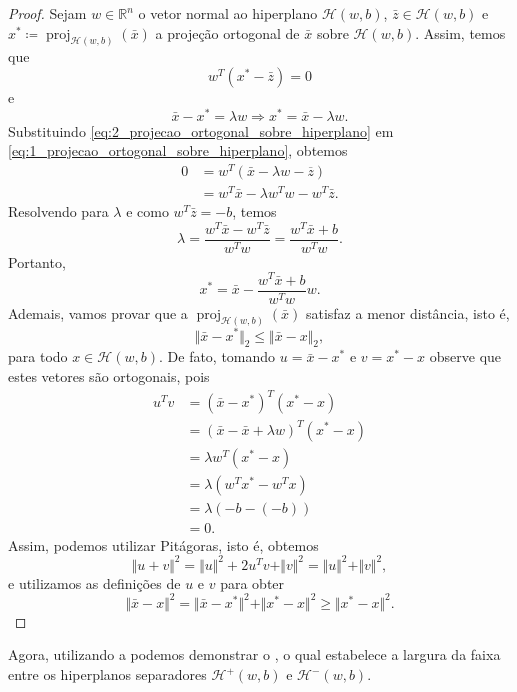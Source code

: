 \documentclass[12pt,a4paper]{scrartcl}
\DeclareMathOperator{\proj}{proj}
\def\Hset{\mathcal{H}}
\def\RR{\mathds{R}}
\def\xbar{\bar{x}}
\theoremstyle{definition}%
\begin{document}
\begin{proof}
Sejam $w\in \RR^n$ o vetor normal ao hiperplano $\Hset(w,b)$, $\bar{z}\in \Hset(w,b)$ e $x^{*} \coloneqq \proj_{\Hset (w,b)}(\xbar)$ a projeção ortogonal de $\xbar$ sobre $\Hset(w,b)$. Assim, temos que 
\[ \label{eq:1_projecao_ortogonal_sobre_hiperplano} 
w^{T}(x^{*}-\bar{z})=0 
\]
e
\[ \label{eq:2_projecao_ortogonal_sobre_hiperplano} 
\xbar-x^{*}=\lambda w \Longrightarrow x^{*}=\xbar-\lambda w. 
\]
Substituindo \eqref{eq:2_projecao_ortogonal_sobre_hiperplano} em \eqref{eq:1_projecao_ortogonal_sobre_hiperplano}, obtemos
\begin{align}
0 &= w^{T}(\xbar-\lambda w-\overline{z}) \\
&= w^{T}\xbar-\lambda w^{T}w - w^{T}\bar{z}.
\end{align}
Resolvendo para $\lambda$ e como $w^{T}\bar{z} = -b$, temos
\[ \lambda =\dfrac{w^{T}\xbar-w^{T}\bar{z}}{w^{T}w} =\dfrac{w^{T}\xbar+b}{w^{T}w}. \]
Portanto, 
\[ x^{*}=\xbar-\dfrac{w^{T}\xbar+b}{w^{T}w}w . \]
Ademais, vamos provar que a $\proj_{\Hset (w,b)}(\xbar)$ satisfaz a menor distância, isto é,
\[ \Vert\xbar-x^{*}\Vert_{2} \leq \Vert \xbar-x\Vert_{2}, \]
para todo $x\in \Hset(w,b)$.
De fato, tomando $u=\xbar-x^{*}$ e $v=x^{*}-x$ observe que estes vetores são ortogonais, pois 
\begin{align}
u^{T}v&= (\xbar-x^{*})^{T}(x^{*}-x) \\
&= (\xbar-\xbar+\lambda w)^{T}(x^{*}-x) \\
&= \lambda w^{T}(x^{*}-x) \\
&= \lambda (w^{T}x^{*}-w^{T}x) \\
&= \lambda (-b-(-b)) \\
&= 0.
\end{align}
Assim, podemos utilizar Pitágoras, isto é, obtemos
\[ \Vert u+v\Vert^{2}=\Vert u\Vert^{2} + 2u^{T}v + \Vert v\Vert^{2}=\Vert u\Vert^{2} + \Vert v\Vert^{2} , \]
e utilizamos as definições de $u$ e $v$ para obter
\[ 
\Vert \xbar-x\Vert^{2}=\Vert \xbar-x^{*}\Vert^{2} + \Vert x^{*}-x\Vert^{2} \geq \Vert x^{*} - x \Vert^{2} . 
\]
\end{proof}


Agora, utilizando a  podemos demonstrar o , o qual estabelece a largura da faixa entre os hiperplanos separadores $\Hset^{+} (w,b)$ e $\Hset^{-} (w,b)$.
\end{document}
